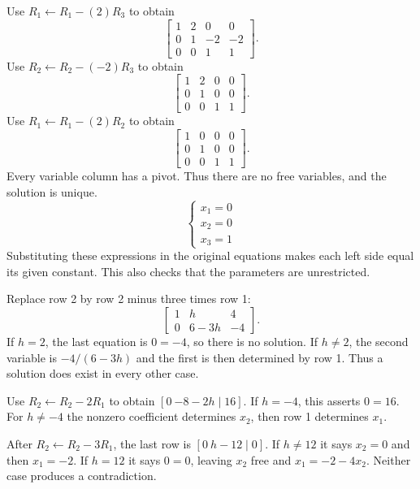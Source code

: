 Use $R_{1}\leftarrow R_{1}-(2)R_{3}$ to obtain
\[ \left[\begin{array}{rrr|r}1&2&0&0\\0&1&-2&-2\\0&0&1&1\end{array}\right].\]
Use $R_{2}\leftarrow R_{2}-(-2)R_{3}$ to obtain
\[ \left[\begin{array}{rrr|r}1&2&0&0\\0&1&0&0\\0&0&1&1\end{array}\right].\]
Use $R_{1}\leftarrow R_{1}-(2)R_{2}$ to obtain
\[ \left[\begin{array}{rrr|r}1&0&0&0\\0&1&0&0\\0&0&1&1\end{array}\right].\]
Every variable column has a pivot. Thus there are no free variables, and the solution is unique.
\[ \begin{cases}x_{1}=0\\x_{2}=0\\x_{3}=1\end{cases}\]
Substituting these expressions in the original equations makes each left side equal its given constant. This also checks that the parameters are unrestricted.

Replace row 2 by row 2 minus three times row 1:
\[
 \begin{bmatrix}1&h&4\\0&6-3h&-4\end{bmatrix}.
\]
If $h=2$, the last equation is $0=-4$, so there is no solution.
If $h\ne2$, the second variable is $-4/(6-3h)$ and the first
is then determined by row 1. Thus a solution does exist in every other case.

Use $R_2\leftarrow R_2-2R_1$ to obtain
$[0\ {-8-2h}\mid16]$. If $h=-4$, this asserts $0=16$.
For $h\ne-4$ the nonzero coefficient determines $x_2$, then row 1
determines $x_1$.

After $R_2\leftarrow R_2-3R_1$, the last row is
$[0\ h-12\mid0]$. If $h\ne12$ it says $x_2=0$ and then
$x_1=-2$. If $h=12$ it says $0=0$, leaving $x_2$ free and
$x_1=-2-4x_2$. Neither case produces a contradiction.

